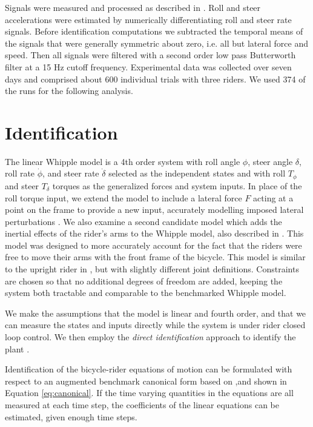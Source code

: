 \documentclass[a4paper]{article}
\begin{document}
Signals were measured and processed as described in \cite{Moore2012}. Roll and
steer accelerations were estimated by numerically differentiating roll and
steer rate signals. Before identification computations we subtracted the
temporal means of the signals that were generally symmetric about zero, i.e.
all but lateral force and speed. Then all signals were filtered with a second
order low pass Butterworth filter at a 15 Hz cutoff frequency.  Experimental
data was collected over seven days and comprised about 600 individual trials
with three riders. We used 374 of the runs for the following analysis.


\section*{Identification}
\label{sec:identification}

The linear Whipple model is a 4th order system with roll angle $\phi$, steer
angle $\delta$, roll rate $\dot{\phi}$, and steer rate $\dot{\delta}$ selected
as the independent states and with roll $T_\phi$ and steer $T_\delta$ torques
as the generalized forces and system inputs. In place of the roll torque input,
we extend the model to include a lateral force $F$ acting at a point on the
frame to provide a new input, accurately modelling imposed lateral
perturbations \cite{Moore2012}.  We also examine a second candidate model which
adds the inertial effects of the rider's arms to the Whipple model, also
described in \cite{Moore2012}. This model was designed to more accurately
account for the fact that the riders were free to move their arms with the
front frame of the bicycle. This model is similar to the upright rider in
\cite{Schwab2010}, but with slightly different joint definitions. Constraints
are chosen so that no additional degrees of freedom are added, keeping the
system both tractable and comparable to the benchmarked Whipple model.

We make the assumptions that the model is linear and fourth order, and that we
can measure the states and inputs directly while the system is under rider
closed loop control. We then employ the \emph{direct identification} approach
to identify the plant \cite{Ljung1999}.

Identification of the bicycle-rider equations of motion can be formulated with
respect to an augmented benchmark canonical form based on
\cite{Meijaard2007},and shown in Equation \ref{eq:canonical}. If the time
varying quantities in the equations are all measured at each time step, the
coefficients of the linear equations can be estimated, given enough time steps.
\end{document}
